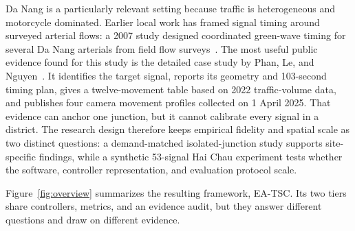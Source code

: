 \documentclass[12pt,a4paper]{report}
\newcommand{\methodname}{EA-TSC}
\begin{document}
Da Nang is a particularly relevant setting because traffic is heterogeneous and motorcycle dominated. Earlier local work has framed signal timing around surveyed arterial flows: a 2007 study designed coordinated green-wave timing for several Da Nang arterials from field flow surveys~\cite{tran2007greenwave}. The most useful public evidence found for this study is the detailed case study by Phan, Le, and Nguyen~\cite{phan2025danang}. It identifies the target signal, reports its geometry and 103-second timing plan, gives a twelve-movement table based on 2022 traffic-volume data, and publishes four camera movement profiles collected on 1 April 2025. That evidence can anchor one junction, but it cannot calibrate every signal in a district. The research design therefore keeps empirical fidelity and spatial scale as two distinct questions: a demand-matched isolated-junction study supports site-specific findings, while a synthetic 53-signal Hai Chau experiment tests whether the software, controller representation, and evaluation protocol scale.

Figure~\ref{fig:overview} summarizes the resulting framework, \methodname{}. Its two tiers share controllers, metrics, and an evidence audit, but they answer different questions and draw on different evidence.
\end{document}
